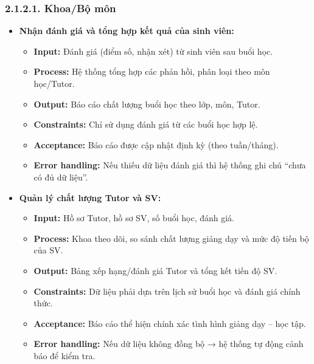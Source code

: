 \subsubsection*{2.1.2.1. Khoa/Bộ môn}
\begin{itemize}
    \item \textbf{Nhận đánh giá và tổng hợp kết quả của sinh viên:}
    \begin{itemize}
        \item \textbf{Input:} Đánh giá (điểm số, nhận xét) từ sinh viên sau buổi học.
        \item \textbf{Process:} Hệ thống tổng hợp các phản hồi, phân loại theo môn học/Tutor.
        \item \textbf{Output:} Báo cáo chất lượng buổi học theo lớp, môn, Tutor.
        \item \textbf{Constraints:} Chỉ sử dụng đánh giá từ các buổi học hợp lệ.
        \item \textbf{Acceptance:} Báo cáo được cập nhật định kỳ (theo tuần/tháng).
        \item \textbf{Error handling:} Nếu thiếu dữ liệu đánh giá thì hệ thống ghi chú “chưa có đủ dữ liệu”.
    \end{itemize}
    
    \item \textbf{Quản lý chất lượng Tutor và SV:}
    \begin{itemize}
        \item \textbf{Input:} Hồ sơ Tutor, hồ sơ SV, số buổi học, đánh giá.
        \item \textbf{Process:} Khoa theo dõi, so sánh chất lượng giảng dạy và mức độ tiến bộ của SV.
        \item \textbf{Output:} Bảng xếp hạng/đánh giá Tutor và tổng kết tiến độ SV.
        \item \textbf{Constraints:} Dữ liệu phải dựa trên lịch sử buổi học và đánh giá chính thức.
        \item \textbf{Acceptance:} Báo cáo thể hiện chính xác tình hình giảng dạy – học tập.
        \item \textbf{Error handling:} Nếu dữ liệu không đồng bộ → hệ thống tự động cảnh báo để kiểm tra. 
    \end{itemize}
    

\end{itemize}

